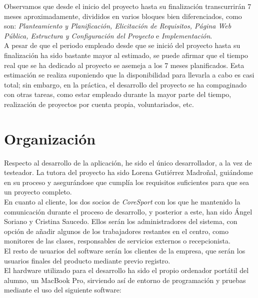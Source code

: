 Observamos que desde el inicio del proyecto hasta su finalización transcurrirán 7 meses aproximadamente, divididos en varios bloques bien diferenciados, como son: \textit{Planteamiento y Planificación, Elicitación de Requisitos, Página Web Pública, Estructura y Configuración del Proyecto} e \textit{Implementación}.\\

A pesar de que el periodo empleado desde que se inició del proyecto hasta su finalización ha sido bastante mayor al estimado, se puede afirmar que el tiempo real que se ha dedicado al proyecto se asemeja a los 7 meses planificados. Esta estimación se realiza suponiendo que la disponibilidad para llevarla a cabo es casi total; sin embargo, en la práctica, el desarrollo del proyecto se ha compaginado con otras tareas, como estar empleado durante la mayor parte del tiempo, realización de proyectos por cuenta propia, voluntariados, etc. 


\section{Organización}

Respecto al desarrollo de la aplicación, he sido el único desarrollador, a la vez de testeador. La tutora del proyecto ha sido Lorena Gutiérrez Madroñal, guiándome en su proceso y asegurándose que cumplía los requisitos suficientes para que sea un proyecto completo. 
\\

En cuanto al cliente, los dos socios de \textsl{CoreSport} con los que he mantenido la comunicación durante el proceso de desarrollo, y posterior a este, han sido Ángel Soriano y Cristina Saucedo. Ellos serán los administradores del sistema, con opción de añadir algunos de los trabajadores restantes en el centro, como monitores de las clases, responsables de servicios externos o recepcionista. 
\\

El resto de usuarios del software serán los clientes de la empresa, que serán los usuarios finales del producto mediante previo registro.
\\

El hardware utilizado para el desarrollo ha sido el propio ordenador portátil del alumno, un MacBook Pro, sirviendo así de entorno de programación y pruebas mediante el uso del siguiente software: 

